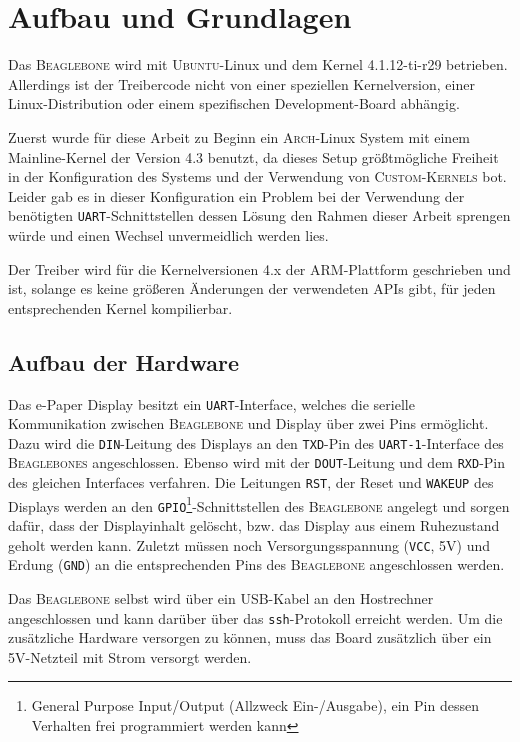 \chapter{Aufbau und Grundlagen} %
Das \textsc{Beaglebone} wird mit \textsc{Ubuntu}-Linux und dem Kernel 4.1.12-ti-r29 betrieben. Allerdings ist der Treibercode nicht von einer speziellen Kernelversion, einer Linux-Distribution oder einem spezifischen Development-Board abhängig. 

Zuerst wurde für diese Arbeit zu Beginn ein \textsc{Arch}-Linux System mit einem Mainline-Kernel der Version 4.3 benutzt, da dieses Setup größtmögliche Freiheit in der Konfiguration des Systems und der Verwendung von \textsc{Custom-Kernels} bot. Leider gab es in dieser Konfiguration ein Problem bei der Verwendung der benötigten \texttt{UART}-Schnittstellen dessen Lösung den Rahmen dieser Arbeit sprengen würde und einen Wechsel unvermeidlich werden lies.

Der Treiber wird für die Kernelversionen 4.x der \textsc{ARM}-Plattform geschrieben und ist, solange es keine größeren Änderungen der verwendeten APIs gibt, für jeden entsprechenden Kernel kompilierbar.

\section{Aufbau der Hardware}
Das e-Paper Display besitzt ein \texttt{UART}-Interface, welches die serielle Kommunikation zwischen \textsc{Beaglebone} und Display über zwei Pins ermöglicht. Dazu wird die \texttt{DIN}-Leitung des Displays an den \texttt{TXD}-Pin des \texttt{UART-1}-Interface des \textsc{Beaglebones} angeschlossen. Ebenso wird mit der \texttt{DOUT}-Leitung und dem \texttt{RXD}-Pin des gleichen Interfaces verfahren. Die Leitungen \texttt{RST}, der Reset und \texttt{WAKEUP} des Displays werden an den \texttt{GPIO}\footnote{General Purpose Input/Output (Allzweck Ein-/Ausgabe), ein Pin dessen Verhalten frei programmiert werden kann}-Schnittstellen des \textsc{Beaglebone} angelegt und sorgen dafür, dass der Displayinhalt gelöscht, bzw. das Display aus einem Ruhezustand geholt werden kann. Zuletzt müssen noch Versorgungsspannung (\texttt{VCC}, 5V) und Erdung (\texttt{GND}) an die entsprechenden Pins des \textsc{Beaglebone} angeschlossen werden.  

Das \textsc{Beaglebone} selbst wird über ein USB-Kabel an den Hostrechner angeschlossen und kann darüber über das \texttt{ssh}-Protokoll erreicht werden. Um die zusätzliche Hardware versorgen zu können, muss das Board zusätzlich über ein 5V-Netzteil mit Strom versorgt werden. 


